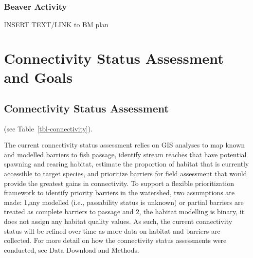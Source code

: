 \documentclass[
  letterpaper,
  DIV=11,
  numbers=noendperiod]{scrreprt}
\begin{document}
\subsection*{Beaver Activity}\label{beaver-activity}

INSERT TEXT/LINK to BM plan


\chapter*{Connectivity Status Assessment and
Goals}\label{connectivity-status-assessment-and-goals}


\section*{Connectivity Status
Assessment}\label{connectivity-status-assessment}


(see Table~\ref{tbl-connectivity}).

The current connectivity status assessment relies on GIS analyses to map
known and modelled barriers to fish passage, identify stream reaches
that have potential spawning and rearing habitat, estimate the
proportion of habitat that is currently accessible to target species,
and prioritize barriers for field assessment that would provide the
greatest gains in connectivity. To support a flexible prioritization
framework to identify priority barriers in the watershed, two
assumptions are made: 1,any modelled (i.e., passability status is
unknown) or partial barriers are treated as complete barriers to passage
and 2, the habitat modelling is binary, it does not assign any habitat
quality values. As such, the current connectivity status will be refined
over time as more data on habitat and barriers are collected. For more
detail on how the connectivity status assessments were conducted, see
Data Download and Methods.
\end{document}
